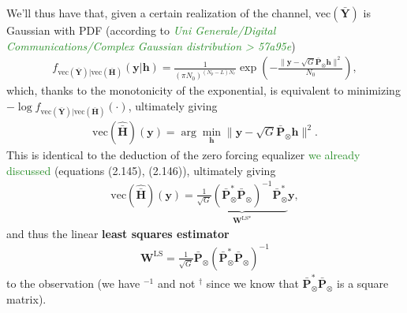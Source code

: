 \documentclass[a4paper, 12pt]{book}
\begin{document}
We'll thus have that, given a certain realization of the channel, $\text{vec}(\bar{\boldsymbol{Y}})$ is Gaussian with PDF (according to \textit{\textcolor{ForestGreen}{Uni Generale/Digital Communications/Complex Gaussian distribution > 57a95e}})
\begin{align}
f_{\text{vec}(\bar{\boldsymbol{Y}})|\text{vec}(\bar{\boldsymbol{H}})}(\boldsymbol{y}|\mathbf{h}) = \frac{1}{(\pi N_0)^{(N_p-L)N_r}} \exp \left( - \frac{\| \boldsymbol{y} - \sqrt{G}\bar{\boldsymbol{P}}_{\otimes}\mathbf{h} \|^2}{N_0} \right), \tag{2.230}
\end{align}
which, thanks to the monotonicity of the exponential, is equivalent to minimizing $-\log f_{\text{vec}(\bar{\boldsymbol{Y}})|\text{vec}(\bar{\boldsymbol{H}})}(\cdot)$, ultimately giving
\begin{align}
\text{vec}(\hat{\bar{\boldsymbol{H}}})(\mathbf{y}) = \arg \min_{\mathbf{h}} \| \boldsymbol{y} - \sqrt{G}\bar{\boldsymbol{P}}_{\otimes}\mathbf{h} \|^2. \tag{2.232}
\end{align}
This is identical to the deduction of the zero forcing equalizer \textcolor{ForestGreen}{we already discussed} (equations (2.145), (2.146)), ultimately giving
\begin{align}
\text{vec}(\hat{\bar{\boldsymbol{H}}})(\mathbf{y}) = \underbrace{\frac{1}{\sqrt{G}}(\bar{\boldsymbol{P}}_{\otimes}^*\bar{\boldsymbol{P}}_{\otimes})^{-1}\bar{\boldsymbol{P}}_{\otimes}^*}_{\boldsymbol{W}^{\text{LS}*}}\boldsymbol{y}, \tag{2.233}
\end{align}
and thus the linear \textbf{least squares estimator}
\begin{align}
\boldsymbol{W}^{\text{LS}} = \frac{1}{\sqrt{G}}\bar{\boldsymbol{P}}_{\otimes}(\bar{\boldsymbol{P}}_{\otimes}^*\bar{\boldsymbol{P}}_{\otimes})^{-1} \tag{2.233+}
\end{align}
to the observation (we have $^{-1}$ and not $^{\dagger}$ since we know that $\bar{\boldsymbol{P}}_{\otimes}^*\bar{\boldsymbol{P}}_{\otimes}$ is a square matrix).
\end{document}

